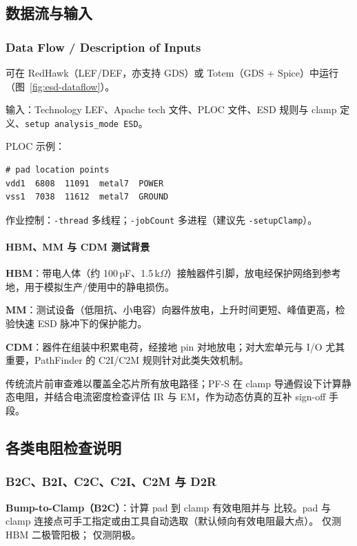 \subsection{数据流与输入}
\subsubsection*{Data Flow / Description of Inputs}

可在 RedHawk（LEF/DEF，亦支持 GDS）或 Totem（GDS + Spice）中运行（图~\ref{fig:esd-dataflow}）。


输入：Technology LEF、Apache tech 文件、PLOC 文件、ESD 规则与 clamp 定义、\texttt{setup analysis\_mode ESD}。

PLOC 示例：
\begin{lstlisting}
# pad location points
vdd1  6808  11091  metal7  POWER
vss1  7038  11612  metal7  GROUND
\end{lstlisting}

作业控制：\texttt{-thread} 多线程；\texttt{-jobCount} 多进程（建议先 \texttt{-setupClamp}）。

\paragraph{HBM、MM 与 CDM 测试背景}
\textbf{HBM}：带电人体（约 100\,pF、1.5\,k$\Omega$）接触器件引脚，放电经保护网络到参考地，用于模拟生产/使用中的静电损伤。

\textbf{MM}：测试设备（低阻抗、小电容）向器件放电，上升时间更短、峰值更高，检验快速 ESD 脉冲下的保护能力。

\textbf{CDM}：器件在组装中积累电荷，经接地 pin 对地放电；对大宏单元与 I/O 尤其重要，PathFinder 的 C2I/C2M 规则针对此类失效机制。

传统流片前审查难以覆盖全芯片所有放电路径；PF-S 在 clamp 导通假设下计算静态电阻，并结合电流密度检查评估 IR 与 EM，作为动态仿真的互补 sign-off 手段。

\subsection{各类电阻检查说明}
\subsubsection*{B2C、B2I、C2C、C2I、C2M 与 D2R}

\textbf{Bump-to-Clamp（B2C）}：计算 pad 到 clamp 有效电阻并与  比较。pad 与 clamp 连接点可手工指定或由工具自动选取（默认倾向有效电阻最大点）。 仅测 HBM 二极管阳极； 仅测阴极。

